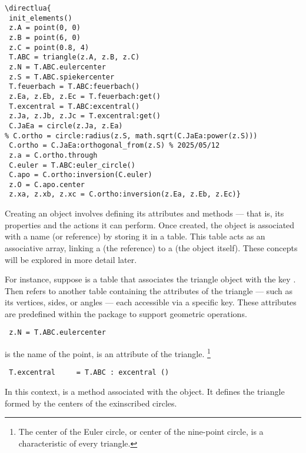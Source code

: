 \begin{mybox}
\begin{verbatim}
\directlua{
 init_elements()
 z.A = point(0, 0)
 z.B = point(6, 0)
 z.C = point(0.8, 4)
 T.ABC = triangle(z.A, z.B, z.C)
 z.N = T.ABC.eulercenter
 z.S = T.ABC.spiekercenter
 T.feuerbach = T.ABC:feuerbach()
 z.Ea, z.Eb, z.Ec = T.feuerbach:get()
 T.excentral = T.ABC:excentral()
 z.Ja, z.Jb, z.Jc = T.excentral:get()
 C.JaEa = circle(z.Ja, z.Ea)
% C.ortho = circle:radius(z.S, math.sqrt(C.JaEa:power(z.S)))
 C.ortho = C.JaEa:orthogonal_from(z.S) % 2025/05/12
 z.a = C.ortho.through
 C.euler = T.ABC:euler_circle()
 C.apo = C.ortho:inversion(C.euler)
 z.O = C.apo.center
 z.xa, z.xb, z.xc = C.ortho:inversion(z.Ea, z.Eb, z.Ec)}
\end{verbatim}
\end{mybox}

Creating an object involves defining its attributes and methods — that is, its properties and the actions it can perform. Once created, the object is associated with a name (or reference) by storing it in a table. This table acts as an associative array, linking a  (the reference) to a  (the object itself). These concepts will be explored in more detail later.

For instance, suppose  is a table that associates the triangle object with the key . Then  refers to another table containing the attributes of the triangle — such as its vertices, sides, or angles — each accessible via a specific key. These attributes are predefined within the package to support geometric operations.

\vspace{1em}
\begin{mybox}
\begin{verbatim}
 z.N = T.ABC.eulercenter
\end{verbatim}
\end{mybox}

 is the name of the point,  is an attribute of the triangle.
\footnote{ The center of the Euler circle, or center of the nine-point circle, is a characteristic of every triangle.}

\begin{mybox}
\begin{verbatim}
 T.excentral     = T.ABC : excentral ()
\end{verbatim}
\end{mybox}

In this context,  is a method associated with the object. It defines the triangle formed by the centers of the exinscribed circles.


